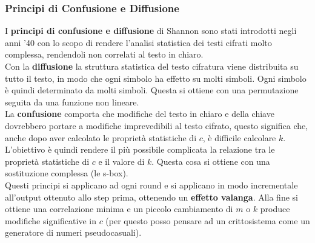 \documentclass[a4paper,12pt, oneside]{book}
\begin{document}
\subsubsection{Principi di Confusione e Diffusione}
I \textbf{principi di confusione e diffusione} di Shannon sono stati introdotti
negli anni '40 con lo scopo di rendere l'analisi statistica dei testi cifrati
molto complessa, rendendoli non correlati al testo in chiaro. \\
Con la \textbf{diffusione} la struttura statistica del testo cifratura viene
distribuita 
su tutto il testo, in modo che ogni simbolo ha effetto su molti simboli. Ogni
simbolo è quindi determinato da molti simboli. Questa si ottiene con una
permutazione seguita da una funzione non lineare.\\
La \textbf{confusione} comporta che modifiche del testo in chiaro e della chiave
dovrebbero portare a modifiche imprevedibili al testo cifrato, questo significa
che, anche dopo aver calcolato le proprietà statistiche di $c$, è difficile
calcolare $k$. L'obiettivo è quindi rendere il più possibile complicata la
relazione tra le proprietà statistiche di $c$ e il valore di $k$. Questa cosa si
ottiene con una sostituzione complessa (le s-box). \\ 
Questi principi si applicano ad ogni round e si applicano in modo incrementale
all'output ottenuto allo step prima, ottenendo un \textbf{effetto valanga}. Alla
fine si ottiene una correlazione minima e un piccolo cambiamento di $m$ o $k$
produce modifiche significative in $c$ (per questo posso pensare ad un
crittosistema come un generatore di numeri pseudocasuali). 
\end{document}
